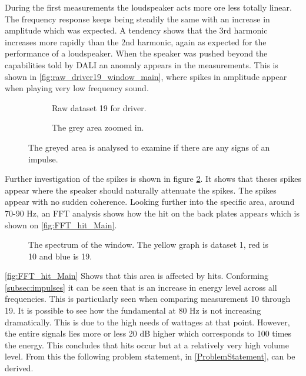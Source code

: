 
During the first measurements the loudspeaker acts more ore less totally linear. The frequency response keeps being steadily the same with an increase in amplitude which was expected. A tendency shows that the 3rd harmonic increases more rapidly than the 2nd harmonic, again as expected for the performance of a loudspeaker. When the speaker was pushed beyond the capabilities told by DALI an anomaly appears in the measurements. This is shown in \autoref{fig:raw_driver19_window_main}, where spikes in amplitude appear when playing very low frequency sound. 

\begin{figure}[H]
\centering
\begin{subfigure}[t]{0.55\textwidth}
	
	\caption{Raw dataset 19 for driver.}
	\label{fig:raw_driver19_window_main}
\end{subfigure}
\begin{subfigure}[t]{0.43\textwidth}
	
	\caption{The grey area zoomed in.}
	\label{fig:raw_driver19_window_zoom_main}
\end{subfigure}
\caption{The greyed area is analysed to examine if there are any signs of an impulse.}
\label{fig:raw_driver19_windows_main}
\end{figure}

Further investigation of the spikes is shown in figure \ref{fig:raw_driver19_window_zoom_main}. It shows that theses spikes appear where the speaker should naturally attenuate the spikes. The spikes appear with no sudden coherence. Looking further into the specific area, around 70-90 Hz, an FFT analysis shows how the hit on the back plates appears which is shown on \autoref{fig:FFT_hit_Main}.

\begin{figure}[H]
\centering
{}

\caption{The spectrum of the window. The yellow graph is dataset 1, red is 10 and blue is 19.}
\label{fig:FFT_hit_Main}
\end{figure}

\autoref{fig:FFT_hit_Main} Shows that this area is affected by hits. Conforming \autoref{subsec:impulses} it can be seen that is an increase in energy level across all frequencies. This is particularly seen when comparing measurement 10 through 19. It is possible to see how the fundamental at 80 Hz is not increasing dramatically. This is due to the high needs of wattages at that point. However, the entire signals lies more or less 20 dB higher which corresponds to 100 times the energy. This concludes that hits occur but at a relatively very high volume level. From this the following problem statement, in \autoref{ProblemStatement}, can be derived.




